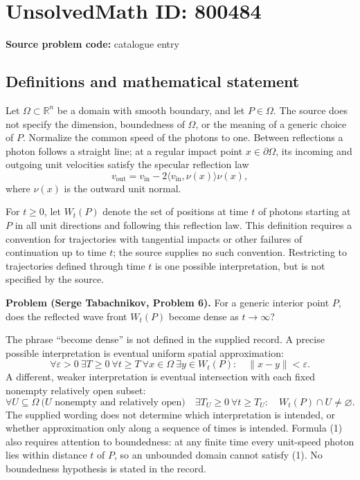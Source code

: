 \documentclass[11pt]{article}
\newcommand{\R}{\mathbb{R}}
\begin{document}
\section*{UnsolvedMath ID: 800484}
\textbf{Source problem code:} catalogue entry
\subsection{Definitions and mathematical statement}
Let \(\Omega\subset\R^n\) be a domain with smooth boundary, and let \(P\in\Omega\). The source does not specify the dimension, boundedness of \(\Omega\), or the meaning of a generic choice of \(P\). Normalize the common speed of the photons to one. Between reflections a photon follows a straight line; at a regular impact point \(x\in\partial\Omega\), its incoming and outgoing unit velocities satisfy the specular reflection law
\[
 v_{\mathrm{out}}=v_{\mathrm{in}}-2\langle v_{\mathrm{in}},\nu(x)\rangle\nu(x),
\]
where \(\nu(x)\) is the outward unit normal.

For \(t\geq0\), let \(W_t(P)\) denote the set of positions at time \(t\) of photons starting at \(P\) in all unit directions and following this reflection law. This definition requires a convention for trajectories with tangential impacts or other failures of continuation up to time \(t\); the source supplies no such convention. Restricting to trajectories defined through time \(t\) is one possible interpretation, but is not specified by the source.

\textbf{Problem (Serge Tabachnikov, Problem 6).} For a generic interior point \(P\), does the reflected wave front \(W_t(P)\) become dense as \(t\to\infty\)?

The phrase ``become dense'' is not defined in the supplied record. A precise possible interpretation is eventual uniform spatial approximation:
\[
 \forall\varepsilon>0\ \exists T\geq0\ \forall t\geq T\ \forall x\in\Omega\
 \exists y\in W_t(P):\quad \|x-y\|<\varepsilon.
\tag{1}
\]
A different, weaker interpretation is eventual intersection with each fixed nonempty relatively open subset:
\[
 \forall U\subseteq\Omega\ \bigl(U\text{ nonempty and relatively open}\bigr)
 \quad\exists T_U\geq0\ \forall t\geq T_U:\quad W_t(P)\cap U\neq\varnothing.
\tag{2}
\]
The supplied wording does not determine which interpretation is intended, or whether approximation only along a sequence of times is intended. Formula (1) also requires attention to boundedness: at any finite time every unit-speed photon lies within distance \(t\) of \(P\), so an unbounded domain cannot satisfy (1). No boundedness hypothesis is stated in the record.
\end{document}

